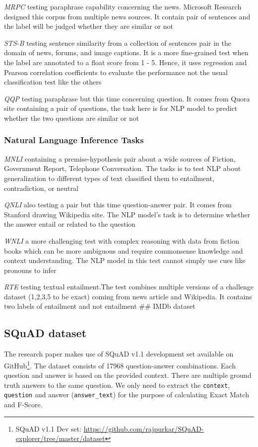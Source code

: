 \documentclass[
  11pt,
]{article}
\begin{document}
\emph{MRPC} testing paraphrase capability concerning the news. Microsoft
Research designed this corpus from multiple news sources. It contain
pair of sentences and the label will be judged whether they are similar
or not

\emph{STS-B} testing sentence similarity from a collection of sentences
pair in the domain of news, forums, and image captions. It is a more
fine-grained test when the label are annotated to a float score from 1 -
5. Hence, it uses regression and Pearson correlation coefficients to
evaluate the performance not the usual classification test like the
others

\emph{QQP} testing paraphrase but this time concerning question. It
comes from Quora site containing a pair of questions, the task here is
for NLP model to predict whether the two questions are similar or not

\subsubsection{Natural Language Inference
Tasks}\label{natural-language-inference-tasks}

\emph{MNLI} containing a premise-hypothesis pair about a wide sources of
Fiction, Government Report, Telephone Conversation. The tasks is to test
NLP about generalization to different types of text classified them to
entailment, contradiction, or neutral

\emph{QNLI} also testing a pair but this time question-answer pair. It
comes from Stanford drawing Wikipedia site. The NLP model's task is to
determine whether the answer entail or related to the question

\emph{WNLI} a more challenging test with complex reasoning with data
from fiction books which can be more ambiguous and require commonsense
knowledge and context understanding. The NLP model in this test cannot
simply use cues like pronouns to infer

\emph{RTE} testing textual entailment.The test combines multiple
versions of a challenge dataset (1,2,3,5 to be exact) coming from news
article and Wikipedia. It contains two labels of entailment and not
entailment \#\# IMDb dataset

\subsection{SQuAD dataset}\label{squad-dataset}

The research paper makes use of SQuAD v1.1 development set available on
GitHub\footnote{SQuAD v1.1 Dev set:
  \url{https://github.com/rajpurkar/SQuAD-explorer/tree/master/dataset}}.
The dataset consists of 17968 question-answer combinations. Each
question and answer is based on the provided context. There are multiple
ground truth answers to the same question. We only need to extract the
\texttt{context}, \texttt{question} and answer (\texttt{answer\_text})
for the purpose of calculating Exact Match and F-Score.
\end{document}
